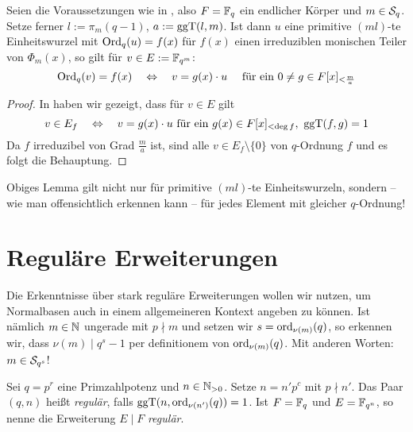 \begin{lemma}
  \label{lemma:erzeuger_von_irred_teilmoduln}
  Seien die Voraussetzungen wie in , also
  $F = \F_q$ ein endlicher Körper und $m\in \S_q$. Setze ferner 
  $l := \pi_m(q-1)$, $a := \ggT(l,m)$. Ist dann $u$ eine primitive 
  $(ml)$-te Einheitswurzel mit $\Ord_q(u) = f(x)$ für $f(x)$ einen irreduziblen
  monischen Teiler von $\Phi_m(x)$, so gilt für $v \in E:= \F_{q^m}$:
  \[ \Ord_q(v) = f(x) \quad\Leftrightarrow\quad
    v = g(x) \cdot u\quad\text{ für ein } 0\neq g\in F[x]_{<\frac m a}\]
\end{lemma}
\begin{proof}
  In  haben wir gezeigt, dass für $v \in E$ gilt
  \[ v \in E_f \quad\Leftrightarrow\quad v = g(x)\cdot u 
    \text{ für ein } g(x) \in F[x]_{<\deg f},\ \ggT(f,g) = 1\]
  Da $f$ irreduzibel von Grad $\frac m a$ ist, sind alle $v \in
  E_f\setminus\{0\}$ von $q$-Ordnung $f$ und es folgt die Behauptung.
\end{proof}

\begin{bemerkung}
  Obiges Lemma gilt nicht nur für primitive $(ml)$-te Einheitswurzeln, sondern
  -- wie man offensichtlich erkennen kann -- für jedes Element mit gleicher
  $q$-Ordnung!
\end{bemerkung}




\section{Reguläre Erweiterungen}

Die Erkenntnisse über stark reguläre Erweiterungen wollen wir nutzen, um
Normalbasen auch in einem allgemeineren Kontext angeben zu können. Ist nämlich
$m\in\N$ ungerade mit $p\nmid m$ und setzen wir $s = \ord_{\nu(m)}(q)$, 
so erkennen wir, dass $\nu(m) \mid q^s-1$ per definitionem von
$\ord_{\nu(m)}(q)$. Mit anderen Worten: $m \in \S_{q^s}$! 

\begin{definition}[regulär]
  Sei $q = p^r$ eine Primzahlpotenz und $n\in \N_{>0}$. Setze 
  $n = n' p^c$ mit $p\nmid n'$. Das Paar $(q,n)$ heißt \emph{regulär}, falls
  $\ggT(n, \ord_{\nu(n')}(q)) = 1$. 
  Ist $F = \F_q$ und $E = \F_{q^n}$, so nenne die Erweiterung $E\mid F$ 
  \emph{regulär}.
\end{definition}

